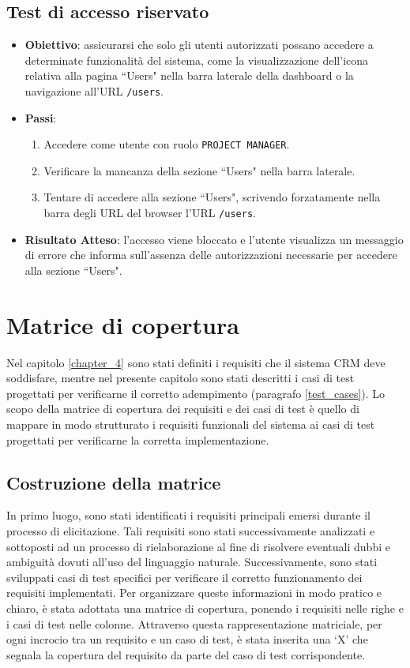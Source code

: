 \documentclass[target=bach,aauheader=,style=]{thud}
\begin{document}
\subsection{Test di accesso riservato}
\begin{itemize}
    \item \textbf{Obiettivo}: assicurarsi che solo gli utenti autorizzati possano accedere a determinate funzionalità del sistema, come la visualizzazione dell'icona relativa alla pagina ``Users" nella barra laterale della dashboard o la navigazione all'URL \texttt{/users}.
    \item \textbf{Passi}:
    \begin{enumerate}
        \item Accedere come utente con ruolo \texttt{PROJECT MANAGER}.
        \item Verificare la mancanza della  sezione ``Users" nella barra laterale.
        \item Tentare di accedere alla sezione ``Users", scrivendo forzatamente nella barra degli URL del browser l'URL \texttt{/users}.
    \end{enumerate}
    \item \textbf{Risultato Atteso}: l'accesso viene bloccato e l'utente visualizza un messaggio di errore che informa sull'assenza delle autorizzazioni necessarie per accedere alla sezione ``Users".
\end{itemize}

\section{Matrice di copertura}
Nel capitolo \ref{chapter_4} sono stati definiti i requisiti che il sistema CRM deve soddisfare, mentre nel presente capitolo sono stati descritti i casi di test progettati per verificarne il corretto adempimento (paragrafo \ref{test_cases}). Lo scopo della matrice di copertura dei requisiti e dei casi di test è quello di mappare in modo strutturato i requisiti funzionali del sistema ai casi di test progettati per verificarne la corretta implementazione. 

\subsection{Costruzione della matrice}
In primo luogo, sono stati identificati i requisiti principali emersi durante il processo di elicitazione. Tali requisiti sono stati successivamente analizzati e sottoposti ad un processo di rielaborazione al fine di risolvere eventuali dubbi e ambiguità dovuti all'uso del linguaggio naturale. Successivamente, sono stati sviluppati casi di test specifici per verificare il corretto funzionamento dei requisiti implementati. Per organizzare queste informazioni in modo pratico e chiaro, è stata adottata una matrice di copertura, ponendo i requisiti nelle righe e i casi di test nelle colonne. Attraverso questa rappresentazione matriciale, per ogni incrocio tra un requisito e un caso di test, è stata inserita una `X' che segnala la copertura del requisito da parte del caso di test corrispondente.
\end{document}
